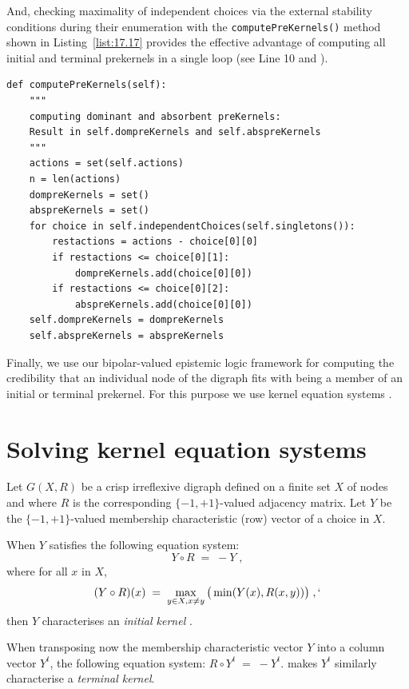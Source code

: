 And, checking maximality of independent choices via the external stability conditions during their enumeration with the \texttt{computePreKernels()} method shown in Listing~\vref{list:17.17} provides the effective advantage of computing all initial and terminal prekernels in a single loop (see Line 10 and \citealp{BIS-2006b}).
\begin{lstlisting}[caption={Computing dominant and absorbent preKernels},label=list:17.17]
def computePreKernels(self):
    """
    computing dominant and absorbent preKernels:
    Result in self.dompreKernels and self.abspreKernels
    """
    actions = set(self.actions)
    n = len(actions)
    dompreKernels = set()
    abspreKernels = set()
    for choice in self.independentChoices(self.singletons()):
        restactions = actions - choice[0][0]
        if restactions <= choice[0][1]:
            dompreKernels.add(choice[0][0])
        if restactions <= choice[0][2]:
            abspreKernels.add(choice[0][0])
    self.dompreKernels = dompreKernels
    self.abspreKernels = abspreKernels
\end{lstlisting}
 
Finally, we use our bipolar-valued epistemic logic framework for computing the credibility that an individual node of the digraph fits with being a member of an initial or terminal prekernel. For this purpose we use kernel equation systems \citep*{SCH-1985}.

\section{Solving kernel equation systems}
\label{sec:17.6}

Let $G(X,R)$ be a crisp irreflexive digraph defined on a finite set $X$ of nodes and where $R$ is the corresponding $\{-1,+1\}$-valued adjacency matrix. Let $Y$ be the $\{-1,+1\}$-valued membership characteristic (row) vector of a choice in $X$.

When $Y$ satisfies the following equation system:
\begin{equation}\label{eq:17.1}
  Y \circ R \; = \; -Y\;,
\end{equation}
where for all $x$ in $X$,
\begin{equation}\label{eq:17.2}
     (Y \circ R)(x) \; = \; \max_{y \in X, x \neq y} \big ( \min(Y(x), R(x,y))\big)\;,`
\end{equation}
then $Y$ characterises an \emph{initial kernel} \citep*{BIS-2006a,BIS-2006b}.

When transposing now the membership characteristic vector $Y$ into a column vector $Y^t$, the following equation system: $R \circ Y^t \; = \; -Y^t$.
makes $Y^t$ similarly characterise a \emph{terminal kernel}.

